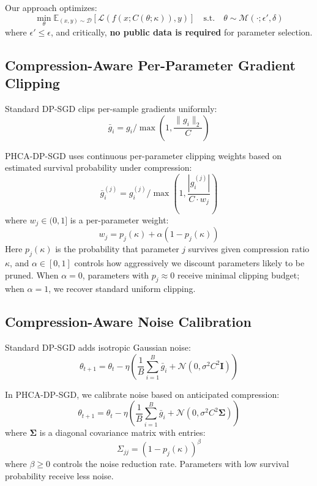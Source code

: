 \documentclass[11pt,a4paper]{article}
\begin{document}
Our approach optimizes:
\begin{equation}
\min_{\theta} \mathbb{E}_{(x,y) \sim \mathcal{D}}[\mathcal{L}(f(x; C(\theta; \kappa)), y)] \quad \text{s.t.} \quad \theta \sim \mathcal{M}(\cdot; \epsilon', \delta)
\end{equation}
where $\epsilon' \leq \epsilon$, and critically, \textbf{no public data is required} for parameter selection.

\subsection{Compression-Aware Per-Parameter Gradient Clipping}

Standard DP-SGD clips per-sample gradients uniformly:
\begin{equation}
\bar{g}_i = g_i / \max\left(1, \frac{\|g_i\|_2}{C}\right)
\end{equation}

PHCA-DP-SGD uses continuous per-parameter clipping weights based on estimated survival probability under compression:
\begin{equation}
\bar{g}_i^{(j)} = g_i^{(j)} / \max\left(1, \frac{|g_i^{(j)}|}{C \cdot w_j}\right)
\end{equation}
where $w_j \in (0, 1]$ is a per-parameter weight:
\begin{equation}
w_j = p_j(\kappa) + \alpha(1 - p_j(\kappa))
\end{equation}
Here $p_j(\kappa)$ is the probability that parameter $j$ survives given compression ratio $\kappa$, and $\alpha \in [0, 1]$ controls how aggressively we discount parameters likely to be pruned. When $\alpha = 0$, parameters with $p_j \approx 0$ receive minimal clipping budget; when $\alpha = 1$, we recover standard uniform clipping.

\subsection{Compression-Aware Noise Calibration}

Standard DP-SGD adds isotropic Gaussian noise:
\begin{equation}
\theta_{t+1} = \theta_t - \eta \left(\frac{1}{B}\sum_{i=1}^B \bar{g}_i + \mathcal{N}(0, \sigma^2 C^2 \mathbf{I})\right)
\end{equation}

In PHCA-DP-SGD, we calibrate noise based on anticipated compression:
\begin{equation}
\theta_{t+1} = \theta_t - \eta \left(\frac{1}{B}\sum_{i=1}^B \bar{g}_i + \mathcal{N}(0, \sigma^2 C^2 \mathbf{\Sigma})\right)
\end{equation}
where $\mathbf{\Sigma}$ is a diagonal covariance matrix with entries:
\begin{equation}
\Sigma_{jj} = (1 - p_j(\kappa))^\beta
\end{equation}
where $\beta \geq 0$ controls the noise reduction rate. Parameters with low survival probability receive less noise.
\end{document}

